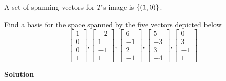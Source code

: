 \documentclass[11pt]{scrartcl}
\theoremstyle{dotlessP}
\theoremstyle{dotlessN}
\DeclarePairedDelimiter\set{\{}{\}}
\begin{document}
A set of spanning vectors for $T$'s image is $\set*{(1,0)
}$.
\begin{ques}
	Find a basis for the space spanned by the five vectors depicted below
	\[
	\begin{bmatrix}
	1 \\
	0 \\
	0 \\
	1
	\end{bmatrix},
	\begin{bmatrix}
		-2 \\
		1 \\
		-1 \\
		1
	\end{bmatrix}, 
	\begin{bmatrix}
		6 \\
		-1 \\
		2 \\
		-1
	\end{bmatrix},
	\begin{bmatrix}
		5 \\
		-3 \\
		3 \\
		-4
	\end{bmatrix},
	\begin{bmatrix}
		0 \\
		3 \\
		-1 \\
		1
	\end{bmatrix}
	\] 
\end{ques}
\textbf{Solution}
\end{document}
